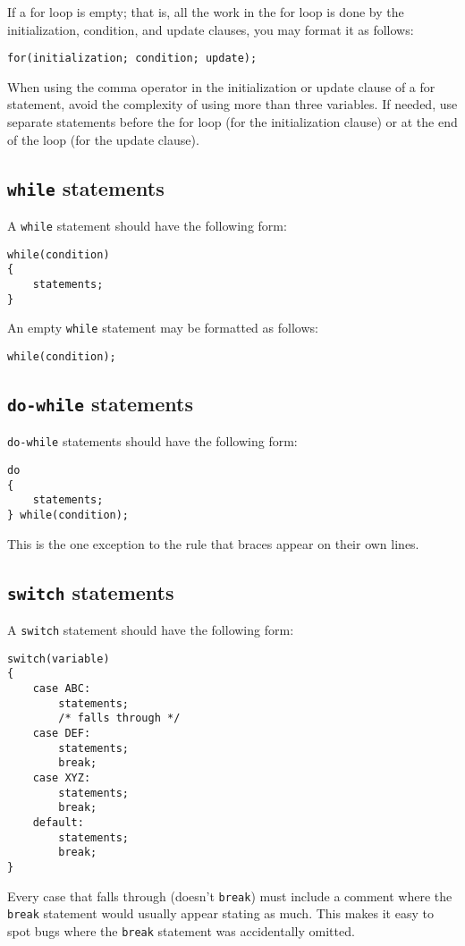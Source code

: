\documentclass{article}
\newcommand{\code}[1]{\texttt{\colorbox{gray!30}{#1}}}
\begin{document}
If a for loop is empty; that is, all the work in the for loop is done by the initialization, condition, and update clauses, you may format it as follows:
\begin{lstlisting}
for(initialization; condition; update);
\end{lstlisting}

When using the comma operator in the initialization or update clause of a for statement, avoid the complexity of using more than three variables.
If needed, use separate statements before the for loop (for the initialization clause) or at the end of the loop (for the update clause).

\subsection{\code{while} statements}
A \code{while} statement should have the following form:
\begin{lstlisting}
while(condition)
{
	statements;
}
\end{lstlisting}

An empty \code{while} statement may be formatted as follows:
\begin{lstlisting}
while(condition);
\end{lstlisting}

\subsection{\code{do-while} statements}
\code{do-while} statements should have the following form:
\begin{lstlisting}
do
{
	statements;
} while(condition);
\end{lstlisting}

This is the one exception to the rule that braces appear on their own lines.

\subsection{\code{switch} statements}
A \code{switch} statement should have the following form:
\begin{lstlisting}
switch(variable)
{
	case ABC:
		statements;
		/* falls through */
	case DEF:
		statements;
		break;
	case XYZ:
		statements;
		break;
	default:
		statements;
		break;
}
\end{lstlisting}

Every case that falls through (doesn't \code{break}) must include a comment where the \code{break} statement would usually appear stating as much.
This makes it easy to spot bugs where the \code{break} statement was accidentally omitted.
\end{document}
